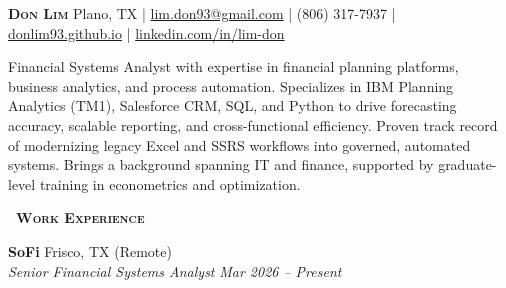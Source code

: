 \documentclass[a4paper,11pt]{article}
\newcommand{\header} [1] {
    {\textsc{\textbf{\Large{\xrfill[0.5ex]{0.5pt}~#1~\xrfill[0.5ex]{0.5pt}}}}}
}
\begin{document}
\vspace*{-0.45in}
\fontsize{10.0}{11}\selectfont

\begin{raggedright}
    {\Huge\textbf{\textsc{Don Lim}}} \hfill Plano, TX |
\href{mailto:lim.don93@gmail.com}{lim.don93@gmail.com} | (806) 317-7937 | \href{https://donlim93.github.io/}{donlim93.github.io} | \href{https://www.linkedin.com/in/lim-don/}{linkedin.com/in/lim-don} \\ \vspace{2mm}
\end{raggedright}

Financial Systems Analyst with expertise in financial planning platforms, business analytics, and process automation. Specializes in IBM Planning Analytics (TM1), Salesforce CRM, SQL, and Python to drive forecasting accuracy, scalable reporting, and cross-functional efficiency. Proven track record of modernizing legacy Excel and SSRS workflows into governed, automated systems. Brings a background spanning IT and finance, supported by graduate-level training in econometrics and optimization.

\vspace{1mm}
\header{Work Experience} 

\vspace{1mm}
\textbf{SoFi} \hfill Frisco, TX (Remote) \\
\textit{Senior Financial Systems Analyst} \hfill \textit{Mar 2026 -- Present}
\end{document}
